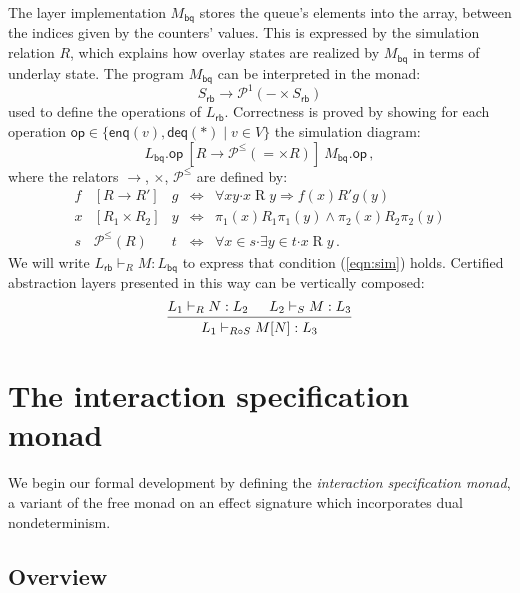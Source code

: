\documentclass[sigplan,screen]{acmart}
\newcommand{\kw}[1]{\ensuremath{ \mathsf{#1} }}
\newcommand{\bdot}{\boldsymbol{\cdot}}
\begin{document}
The layer implementation $M_\kw{bq}$ 
stores the queue's elements into the array,
between the indices given by the counters' values.
This is expressed by the simulation relation $R$,
which explains how overlay states are realized by $M_\kw{bq}$ 
in terms of underlay state.
The program $M_\kw{bq}$ can be interpreted in the monad:
\[
    S_\kw{rb} \rightarrow \mathcal{P}^1(- \times S_\kw{rb})
\]
used to define the operations of $L_\kw{rb}$.
Correctness is proved by showing
for each operation
$\kw{op} \in \{ \kw{enq}(v), \kw{deq}(*) \mid v \in V \}$
the simulation diagram:
\begin{equation}
  \label{eqn:sim}
  L_\kw{bq}.\kw{op}
  \: \mathrel{[R \rightarrow \mathcal{P}^\le({=} \times R)]} \:
  M_\kw{bq}.\kw{op} \,,
\end{equation}
where the relators $\rightarrow$, $\times$, $\mathcal{P}^\le$
are defined by:
\[
  \begin{array}{rclcl}
    f & [R \rightarrow R'] & g & \Leftrightarrow &
    \forall x y \bdot x \mathrel{R} y \Rightarrow
    f(x) \mathrel{R'} g(y) \\
  x & [R_1 \times R_2] & y & \Leftrightarrow &
    \pi_1(x) \mathrel{R_1} \pi_1(y) \wedge
    \pi_2(x) \mathrel{R_2} \pi_2(y) \\
  s & \mathcal{P}^\le(R) & t & \Leftrightarrow &
    \forall x \in s \bdot \exists y \in t \bdot x \mathrel{R} y \,.
  \end{array}
\]
We will write $L_\kw{rb} \vdash_R M : L_\kw{bq}$
to express that condition (\ref{eqn:sim}) holds.
Certified abstraction layers presented in this way
can be vertically composed:
\[
  \begin{prooftree}
    \hypo{L_1 \vdash_R N : L_2}
    \hypo{L_2 \vdash_S M : L_3}
    \infer2{L_1 \vdash_{R \circ S} M[N] : L_3}
  \end{prooftree}
\]



\section{The interaction specification monad} \label{sec:intspec} %

We begin our formal development
by defining the \emph{interaction specification monad},
a variant of the free monad on an effect signature which
incorporates dual nondeterminism.

\subsection{Overview} %
\end{document}

